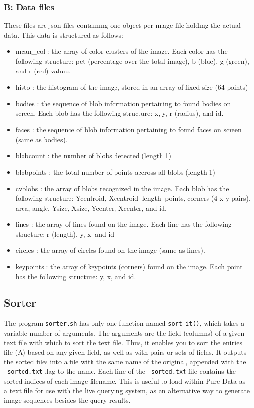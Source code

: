 \subsubsection{B: Data files}

These files are \gls{json} files containing one object per image file holding the actual data. This data is structured as follows:

\begin{itemize}
\item mean\_col : the array of color clusters of the image. Each color has the following structure: pct (percentage over the total image), b (blue), g (green), and r (red) values.
\item histo : the histogram of the image, stored in an array of fixed size (64 points)
\item bodies : the sequence of blob information pertaining to found bodies on screen. Each blob has the following structure: x, y, r (radius), and id.
\item faces : the sequence of blob information pertaining to found faces on screen (same as bodies).
\item blobcount : the number of blobs detected (length 1)
\item blobpoints :  the total number of points accross all blobs (length 1)
\item cvblobs : the array of blobs recognized in the image. Each blob has the following structure: Ycentroid, Xcentroid, length, points, corners (4 x-y pairs), area, angle, Ysize, Xsize, Ycenter, Xcenter, and id. 
\item lines : the array of lines found on the image. Each line has the following structure: r (length), y, x, and id. 
\item circles : the array of circles found on the image (same as lines).
\item keypoints : the array of keypoints (corners) found on the image. Each point has the following structure: y, x, and id.
\end{itemize}


\subsection{Sorter}

The program \texttt{sorter.sh} has only one function named \texttt{sort_it()}, which takes a variable number of arguments. The arguments are the field (columns) of a given text file with which to sort the text file. Thus, it enables you to sort the entries file (A) based on any given field, as well as with pairs or sets of fields. It outputs the sorted files into a file with the same name of the original, appended with the \texttt{-sorted.txt} flag to the name. Each line of the \texttt{-sorted.txt} file contains the sorted indices of each image filename. This is useful to load within Pure Data as a text file for use with the live querying system, as an alternative way to generate image sequences besides the query results.




